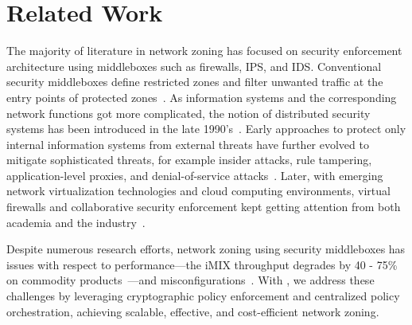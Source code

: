 \chapter{Related Work}
\label{related}


The majority of literature in network zoning has focused on security enforcement
architecture using middleboxes such as firewalls, IPS, and IDS. Conventional
security middleboxes define restricted zones and filter unwanted traffic at the
entry points of protected zones~\cite{cheswick1994firewalls}. As information
systems and the corresponding network functions got more complicated, the notion
of distributed security systems has been introduced in the late
1990's~\cite{bellovin1999distributed}. Early approaches to protect only internal
information systems from external threats have further evolved to mitigate
sophisticated threats, for example insider attacks, rule tampering,
application-level proxies, and denial-of-service
attacks~\cite{markham2001security}. Later, with emerging network virtualization
technologies and cloud computing environments, virtual firewalls and
collaborative security enforcement kept getting attention from both academia and
the industry~\cite{liu2008collaborative,yu2017psi}.

Despite numerous research efforts, network zoning using security middleboxes has
issues with respect to performance---the iMIX throughput degrades by 40 - 75\%
on commodity products~\cite{juniper2020comparison}---and
misconfigurations~\cite{fayaz2016buzz,tschaen2016sfc,yuan2020netsmc}. With
\name, we address these challenges by leveraging cryptographic policy
enforcement and centralized policy orchestration, achieving scalable, effective,
and cost-efficient network zoning.


